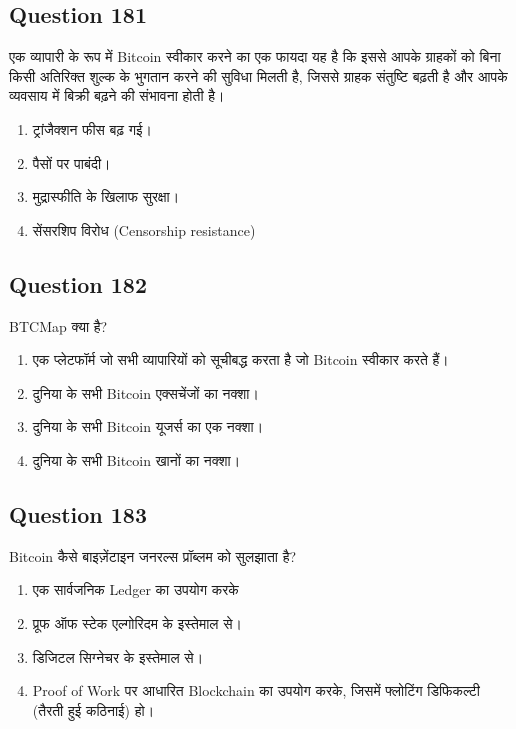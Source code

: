 \documentclass[12pt,a4paper]{article}
\begin{document}
\bigskip


\subsection*{Question 181}
एक व्यापारी के रूप में Bitcoin स्वीकार करने का एक फायदा यह है कि इससे आपके ग्राहकों को बिना किसी अतिरिक्त शुल्क के भुगतान करने की सुविधा मिलती है, जिससे ग्राहक संतुष्टि बढ़ती है और आपके व्यवसाय में बिक्री बढ़ने की संभावना होती है।

\begin{enumerate}[label=\Alph*., leftmargin=*]
\item ट्रांजैक्शन फीस बढ़ गई।
\item पैसों पर पाबंदी।
\item मुद्रास्फीति के खिलाफ सुरक्षा।
\item सेंसरशिप विरोध (Censorship resistance)
\end{enumerate}

\bigskip


\subsection*{Question 182}
BTCMap क्या है?

\begin{enumerate}[label=\Alph*., leftmargin=*]
\item एक प्लेटफॉर्म जो सभी व्यापारियों को सूचीबद्ध करता है जो Bitcoin स्वीकार करते हैं।
\item दुनिया के सभी Bitcoin एक्सचेंजों का नक्शा।
\item दुनिया के सभी Bitcoin यूजर्स का एक नक्शा।
\item दुनिया के सभी Bitcoin खानों का नक्शा।
\end{enumerate}

\bigskip


\subsection*{Question 183}
Bitcoin कैसे बाइज़ेंटाइन जनरल्स प्रॉब्लम को सुलझाता है?

\begin{enumerate}[label=\Alph*., leftmargin=*]
\item एक सार्वजनिक Ledger का उपयोग करके
\item प्रूफ ऑफ स्टेक एल्गोरिदम के इस्तेमाल से।
\item डिजिटल सिग्नेचर के इस्तेमाल से।
\item Proof of Work पर आधारित Blockchain का उपयोग करके, जिसमें फ्लोटिंग डिफिकल्टी (तैरती हुई कठिनाई) हो।
\end{enumerate}
\end{document}
